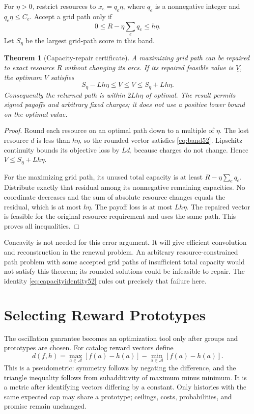 \documentclass[11pt,letterpaper]{article}
\newtheorem{theorem}{Theorem}[section]
\theoremstyle{definition}\newtheorem{remark}[theorem]{Remark}
\begin{document}
For $\eta>0$, restrict resources to $x_e=q_e\eta$, where $q_e$ is a nonnegative integer and $q_e\eta\leq C_e$. Accept a grid path only if
\begin{equation}\label{eq:band52}
 0\leq R-\eta\sum_e q_e\leq h\eta.
\end{equation}
Let $S_\eta$ be the largest grid-path score in this band.
\begin{theorem}[Capacity-repair certificate]\label{thm:repair52}
A maximizing grid path can be repaired to exact resource $R$ without changing its arcs. If its repaired feasible value is $\underline V$, the optimum $V$ satisfies
\begin{equation}\label{eq:generalcert52}
 S_\eta-Lh\eta\leq\underline V\leq V\leq S_\eta+Lh\eta.
\end{equation}
Consequently the returned path is within $2Lh\eta$ of optimal. The result permits signed payoffs and arbitrary fixed charges; it does not use a positive lower bound on the optimal value.
\end{theorem}
\begin{proof}
Round each resource on an optimal path down to a multiple of $\eta$. The lost resource $d$ is less than $h\eta$, so the rounded vector satisfies \eqref{eq:band52}. Lipschitz continuity bounds its objective loss by $Ld$, because charges do not change. Hence $V\leq S_\eta+Lh\eta$.

For the maximizing grid path, its unused total capacity is at least $R-\eta\sum_e q_e$. Distribute exactly that residual among its nonnegative remaining capacities. No coordinate decreases and the sum of absolute resource changes equals the residual, which is at most $h\eta$. The payoff loss is at most $Lh\eta$. The repaired vector is feasible for the original resource requirement and uses the same path. This proves all inequalities.
\end{proof}

Concavity is not needed for this error argument. It will give efficient convolution and reconstruction in the renewal problem. An arbitrary resource-constrained path problem with some accepted grid paths of insufficient total capacity would not satisfy this theorem; its rounded solutions could be infeasible to repair. The identity \eqref{eq:capacityidentity52} rules out precisely that failure here.

\section{Selecting Reward Prototypes}\label{sec:grouping59}
The oscillation guarantee becomes an optimization tool only after groups and prototypes are chosen. For catalog reward vectors define
\[
 d(f,h)=\max_{a\in\mathcal A}[f(a)-h(a)]-\min_{a\in\mathcal A}[f(a)-h(a)].
\]
This is a pseudometric: symmetry follows by negating the difference, and the triangle inequality follows from subadditivity of maximum minus minimum. It is a metric after identifying vectors differing by a constant. Only histories with the same expected cap may share a prototype; ceilings, costs, probabilities, and promise remain unchanged.
\end{document}
